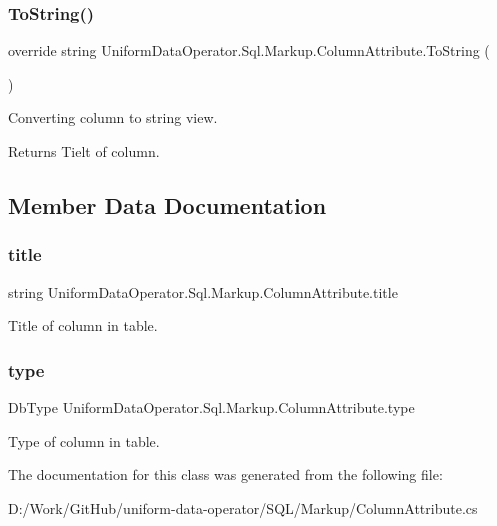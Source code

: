 \subsubsection{\texorpdfstring{To\+String()}{ToString()}}
{\footnotesize\ttfamily override string Uniform\+Data\+Operator.\+Sql.\+Markup.\+Column\+Attribute.\+To\+String (\begin{DoxyParamCaption}{ }\end{DoxyParamCaption})}



Converting column to string view. 

\begin{DoxyReturn}{Returns}
Tielt of column.
\end{DoxyReturn}


\subsection{Member Data Documentation}
\mbox{\label{class_uniform_data_operator_1_1_sql_1_1_markup_1_1_column_attribute_ab12600e7022c9c4aa36816f89e360d01}} 
\subsubsection{\texorpdfstring{title}{title}}
{\footnotesize\ttfamily string Uniform\+Data\+Operator.\+Sql.\+Markup.\+Column\+Attribute.\+title}



Title of column in table. 

\mbox{\label{class_uniform_data_operator_1_1_sql_1_1_markup_1_1_column_attribute_a35e345cb138b9b436a62d1d8594c8e1a}} 
\subsubsection{\texorpdfstring{type}{type}}
{\footnotesize\ttfamily Db\+Type Uniform\+Data\+Operator.\+Sql.\+Markup.\+Column\+Attribute.\+type}



Type of column in table. 



The documentation for this class was generated from the following file\+:\begin{DoxyCompactItemize}
\item 
D\+:/\+Work/\+Git\+Hub/uniform-\/data-\/operator/\+S\+Q\+L/\+Markup/Column\+Attribute.\+cs\end{DoxyCompactItemize}
